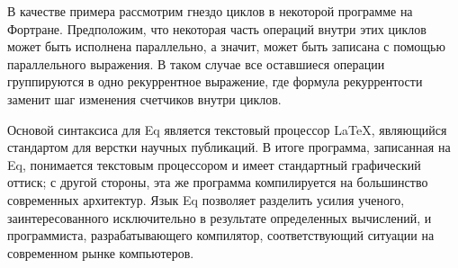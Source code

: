 \documentclass[a4paper]{llncs}
\begin{document}
В качестве примера рассмотрим гнездо циклов в некоторой программе на Фортране.
Предположим, что некоторая часть операций внутри этих циклов может быть
исполнена параллельно, а значит, может быть записана с помощью параллельного
выражения. В таком случае все оставшиеся операции группируются в одно
рекуррентное выражение, где формула рекуррентости заменит шаг изменения
счетчиков внутри циклов.

Основой синтаксиса для Eq является текстовый процессор \LaTeX, являющийся
стандартом для верстки научных публикаций. В итоге программа, записанная на Eq,
понимается текстовым процессором и имеет стандартный графический оттиск; с
другой стороны, эта же программа компилируется на большинство современных
архитектур. Язык Eq позволяет разделить усилия ученого, заинтересованного
исключительно в результате определенных вычислений, и программиста,
разрабатывающего компилятор, соответствующий ситуации на современном рынке
компьютеров.  
\end{document}

